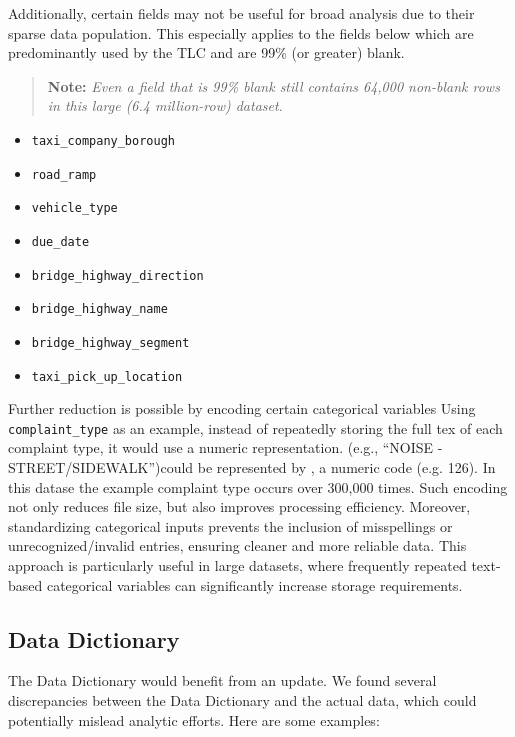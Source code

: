 \documentclass[linenumber]{jdsart}
\begin{document}
Additionally, certain fields may not be useful for broad analysis
due to their sparse data population. This especially applies to the fields below which
are predominantly used by the TLC and are 99\% (or greater) blank. 
\begin{quote}
\textbf{Note:} \textit{Even a field that is 99\% blank still contains 64,000 
non-blank rows in this large (6.4 million-row) dataset.}
\end{quote}

\begin{itemize}
    \item \texttt{taxi\_company\_borough}
    \item \texttt{road\_ramp}
    \item \texttt{vehicle\_type}
    \item \texttt{due\_date}
    \item \texttt{bridge\_highway\_direction}
    \item \texttt{bridge\_highway\_name}
    \item \texttt{bridge\_highway\_segment}
    \item \texttt{taxi\_pick\_up\_location}
\end{itemize}

Further reduction is possible by encoding certain categorical 
variables Using \texttt{complaint\_type} as an example,
instead of repeatedly storing the full tex of each complaint
type, it would use a numeric representation. 
(e.g., ``NOISE - STREET/SIDEWALK'')could be represented by
, a numeric code (e.g. 126). In this datase the example complaint type
occurs over 300,000 times. Such encoding not only reduces file 
size, but also improves processing efficiency. Moreover, 
standardizing categorical inputs prevents the inclusion of 
misspellings or unrecognized/invalid entries, ensuring cleaner 
and more reliable data. This approach is particularly useful in large 
datasets, where frequently repeated text-based categorical variables can 
significantly increase storage requirements. 

\subsection{Data Dictionary} 
\label{sec:datadictionary}

The Data Dictionary would benefit from an update. We found several 
discrepancies between the Data Dictionary and the actual data, which 
could potentially mislead analytic efforts. Here are some examples:
\end{document}
